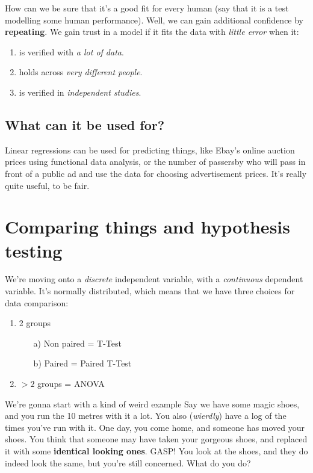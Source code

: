\documentclass[11pt,a4paper,titlepage]{scrartcl}
\begin{document}
How can we be sure that it's a good fit for every human (say that it is a
test modelling some human performance). Well, we can gain additional
confidence by \textbf{repeating}. We gain trust in a model if it fits the
data with \textit{little error} when it:
\begin{enumerate}
    \item is verified with \textit{a lot of data}.
    \item holds across \textit{very different people}.
    \item is verified in \textit{independent studies}.
\end{enumerate}

\subsection{What can it be used for?}%
\label{sub:usage}
Linear regressions can be used for predicting things, like Ebay's online
auction prices using functional data analysis, or the number of passersby
who will pass in front of a public ad and use the data for choosing
advertisement prices. It's really quite useful, to be fair.

\newpage

\section{Comparing things and hypothesis testing}%
\label{sec:comparing}
We're moving onto a \textit{discrete} independent variable, with a
\textit{continuous} dependent variable. It's normally distributed, which
means that we have three choices for data comparison:
\begin{enumerate}
    \item 2 groups
    \begin{enumerate}
        \item[a)] Non paired = T-Test
        \item[b)] Paired = Paired T-Test
    \end{enumerate}
    \item $>2$ groups = ANOVA
\end{enumerate}

We're gonna start with a kind of weird example Say we have some magic
shoes, and you run the 10 metres with it a lot. You also (\textit{wierdly})
have a log of the times you've run with it. One day,
you come home, and someone has moved your shoes. You think that someone
may have taken your gorgeous shoes, and replaced it with some
\textbf{identical looking ones}. GASP! You look at the shoes, and they do
indeed look the same, but you're still concerned. What do you do?
\end{document}
